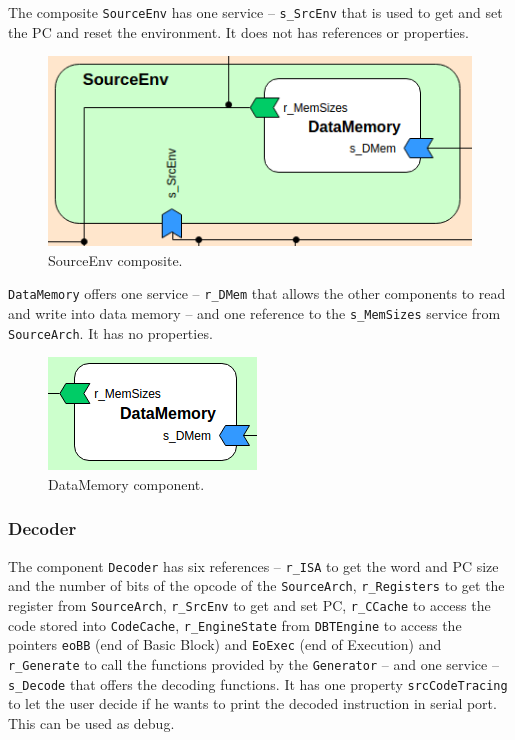 \documentclass{report}
\newcounter{subsubsubsection}[subsubsection]
\begin{document}
			\par The composite \texttt{SourceEnv} has one service -- \texttt{s\_SrcEnv} that is used to get and set the PC and reset the environment. It does not has references or properties.
			
			\begin{figure} [H]
				\centering
				\includegraphics[width=0.5\linewidth]{Images/arch-ref/SourceEnv}
				\caption{SourceEnv composite.}
				\label{fig:SourceEnv}
			\end{figure}
		
				
				\par \texttt{DataMemory} offers one service -- \texttt{r\_DMem} that allows the other components to read and write into data memory -- and one reference to the \texttt{s\_MemSizes} service from \texttt{SourceArch}. It has no properties.
		
				\begin{figure} [H]
					\centering
					\includegraphics[width=0.3\linewidth]{Images/arch-ref/DataMemory}
					\caption{DataMemory component.}
					\label{fig:DataMemory}
				\end{figure}
		
			\subsubsection{Decoder}
			
			\par The component \texttt{Decoder} has six references -- \texttt{r\_ISA} to get the word and PC size and the number of bits of the opcode of the \texttt{SourceArch}, \texttt{r\_Registers} to get the register from \texttt{SourceArch}, \texttt{r\_SrcEnv} to get and set PC, \texttt{r\_CCache} to access the code stored into \texttt{CodeCache}, \texttt{r\_EngineState} from \texttt{DBTEngine} to access the pointers \texttt{eoBB} (end of Basic Block) and \texttt{EoExec} (end of Execution) and \texttt{r\_Generate} to call the functions provided by the \texttt{Generator} -- and one service -- \texttt{s\_Decode} that offers the decoding functions. It has one property \texttt{srcCodeTracing} to let the user decide if he wants to print the decoded instruction in serial port. This can be used as debug. 
			
\end{document}
